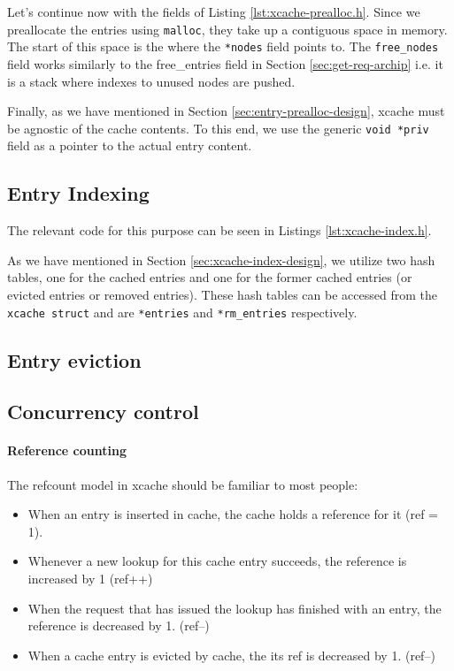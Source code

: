Let's continue now with the fields of Listing \ref{lst:xcache-prealloc.h}. Since 
we preallocate the entries using \texttt{malloc}, they take up a contiguous 
space in memory.  The start of this space is the where the \texttt{*nodes} field 
points to. The \texttt{free\_nodes} field works similarly to the free\_entries 
field in Section \ref{sec:get-req-archip} i.e. it is a stack where indexes to 
unused nodes are pushed.

Finally, as we have mentioned in Section \ref{sec:entry-prealloc-design}, xcache 
must be agnostic of the cache contents. To this end, we use the generic 
\texttt{void *priv} field as a pointer to the actual entry content.

\subsection{Entry Indexing}

The relevant code for this purpose can be seen in Listings 
\ref{lst:xcache-index.h}.


As we have mentioned in Section \ref{sec:xcache-index-design}, we utilize two 
hash tables, one for the cached entries and one for the former cached entries 
(or evicted entries or removed entries). These hash tables can be accessed from 
the \texttt{xcache struct} and are \texttt{*entries} and \texttt{*rm\_entries} 
respectively.

\subsection{Entry eviction}

\subsection{Concurrency control}\label{sec:conc-imp}

\paragraph{Reference counting}\label{par:refcount-imp}

The refcount model in xcache should be familiar to most people:

\begin{itemize}
	\item When an entry is inserted in cache, the cache holds a reference 
		for it (ref = 1).
	\item Whenever a new lookup for this cache entry succeeds, the reference 
		is increased by 1 (ref++)
	\item When the request that has issued the lookup has finished with an 
		entry, the reference is decreased by 1. (ref--)
	\item When a cache entry is evicted by cache, the its ref is decreased 
		by 1. (ref--)
\end{itemize}

